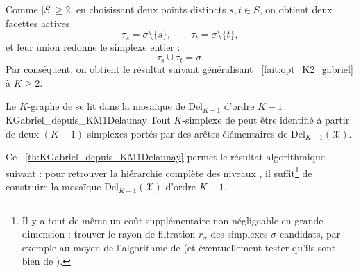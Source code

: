 
Comme \(|S|\geq 2\), en choisissant deux points distincts \(s,t\in S\),
on obtient deux facettes actives
\[
        \tau_s = \sigma\setminus\{s\},
        \qquad
        \tau_t = \sigma\setminus\{t\},
\]
et leur union redonne le simplexe entier :
\[
        \tau_s \cup \tau_t = \sigma .
\]
Par conséquent, on obtient le résultat suivant généralisant \Fact~\ref{fait:opt_K2_gabriel} à $K\ge 2$.
\begin{Theoreme}{Le $K$-graphe de  se lit dans la mosaïque de  \(\mathrm{Del}_{K-1}\) d'ordre $K-1$}{KGabriel_depuis_KM1Delaunay}
Tout \(K\)-simplexe de  peut être identifié à partir de deux \((K-1)\)-simplexes portés par des arêtes élémentaires de \(\mathrm{Del}_{K-1}(\mathcal X)\).
\end{Theoreme}


Ce \Th~\ref{th:KGabriel_depuis_KM1Delaunay} permet le résultat algorithmique suivant : pour retrouver la hiérarchie complète des niveaux \KNN, il suffit\footnote{Il y a tout de même un coût supplémentaire non négligeable en grande dimension : trouver le rayon de filtration $r_\sigma$ des simplexes $\sigma$ candidats, par exemple au moyen de l'algorithme de  \cite{Welzl1991} (et éventuellement tester qu'ils sont bien de ).} de construire la mosaïque \(\mathrm{Del}_{K-1}(\mathcal X)\) d'ordre $K-1$.



